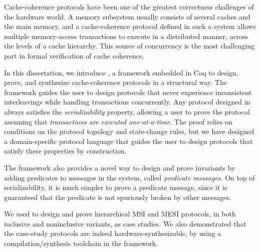
\cleardoublepage
\setcounter{savepage}{\thepage}
\begin{abstractpage}
  Cache-coherence protocols have been one of the greatest correctness challenges of the hardware world.
  A memory subsystem usually consists of several caches and the main memory, and a cache-coherence protocol defined in such a system allows multiple memory-access transactions to execute in a distributed manner, across the levels of a cache hierarchy.
  This source of concurrency is the most challenging part in formal verification of cache coherence.

  In this dissertation, we introduce \hemiola{}, a framework embedded in Coq to design, prove, and synthesize cache-coherence protocols in a structural way.
  The framework guides the user to design protocols that never experience inconsistent interleavings while handling transactions concurrently.
  Any protocol designed in \hemiola{} always satisfies the \emph{serializability} property, allowing a user to prove the protocol assuming that \emph{transactions are executed one-at-a-time}.
  The proof relies on conditions on the protocol topology and state-change rules, but we have designed a domain-specific protocol language that guides the user to design protocols that satisfy these properties by construction.

  The framework also provides a novel way to design and prove invariants by adding predicates to messages in the system, called \emph{predicate messages}.
  On top of serializability, it is much simpler to prove a predicate message, since it is guaranteed that the predicate is not spuriously broken by other messages.

  We used \hemiola{} to design and prove hierarchical MSI and MESI protocols, in both inclusive and noninclusive variants, as case studies.
  We also demonstrated that the case-study protocols are indeed hardware-synthesizable, by using a compilation/synthesis toolchain in the framework.
\end{abstractpage}

